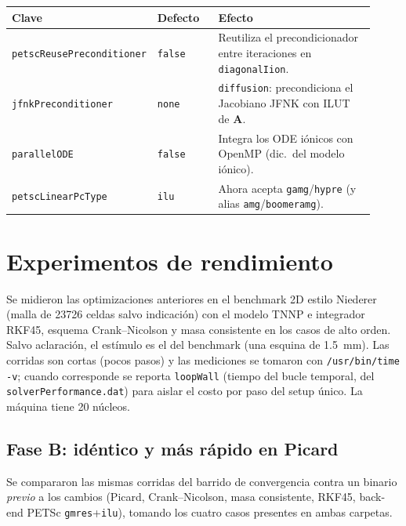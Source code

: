 \documentclass[11pt,a4paper]{article}
\newcommand{\code}[1]{\texttt{\small #1}}
\newcommand{\Aimp}{\mathbf{A}}
\newcommand{\dictkey}[1]{\textcolor{black!60!green}{\texttt{\footnotesize #1}}}
\begin{document}
\begin{center}
\begin{tabular}{@{}p{0.30\linewidth}p{0.17\linewidth}p{0.45\linewidth}@{}}
\toprule
Clave & Defecto & Efecto \\
\midrule
\dictkey{petscReusePreconditioner} & \code{false} & Reutiliza el precondicionador
    entre iteraciones en \dictkey{diagonalIion}. \\
\dictkey{jfnkPreconditioner} & \code{none} & \code{diffusion}: precondiciona el
    Jacobiano JFNK con ILUT de $\Aimp$. \\
\dictkey{parallelODE} & \code{false} & Integra los ODE iónicos con OpenMP
    (dic.\ del modelo iónico). \\
\dictkey{petscLinearPcType} & \code{ilu} & Ahora acepta \code{gamg}/\code{hypre}
    (y alias \code{amg}/\code{boomeramg}). \\
\bottomrule
\end{tabular}
\end{center}

\section{Experimentos de rendimiento}
\label{sec:exp}

Se midieron las optimizaciones anteriores en el benchmark 2D estilo Niederer
(malla de \num{23726} celdas salvo indicación) con el modelo TNNP e integrador
RKF45, esquema Crank--Nicolson y masa consistente en los casos de alto orden.
Salvo aclaración, el estímulo es el del benchmark (una esquina de
\SI{1.5}{\milli\meter}). Las corridas son cortas (pocos pasos) y las mediciones se
tomaron con \code{/usr/bin/time -v}; cuando corresponde se reporta \code{loopWall}
(tiempo del bucle temporal, del \code{solverPerformance.dat}) para aislar el costo
por paso del setup único. La máquina tiene 20 núcleos.

\subsection{Fase B: idéntico y más rápido en Picard}
\label{sec:exp-B}

Se compararon las mismas corridas del barrido de convergencia contra un binario
\emph{previo} a los cambios (Picard, Crank--Nicolson, masa consistente, RKF45,
back-end PETSc \code{gmres}+\code{ilu}), tomando los cuatro casos presentes en
ambas carpetas.
\end{document}
